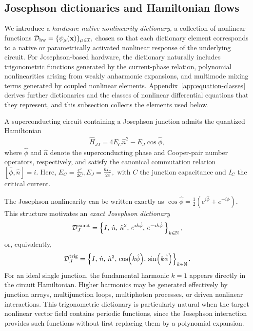 \documentclass[pra,twocolumn,superscriptaddress,nofootinbib,floatfix]{revtex4-2}
\theoremstyle{remark}
\begin{document}
\subsection{Josephson dictionaries and Hamiltonian flows}
\label{subsec:dictionaries}

We introduce a \emph{hardware-native nonlinearity dictionary}, a collection of nonlinear functions
$\mathcal D_{\rm hw} = \{\psi_\mu(\mathbf x) \}_{\mu\in\mathcal I},$
chosen so that each dictionary element corresponds to a native or parametrically activated nonlinear response of the underlying circuit. For Josephson-based hardware, the dictionary naturally includes trigonometric functions generated by the current-phase relation, polynomial nonlinearities arising from weakly anharmonic expansions, and multimode mixing terms generated by coupled nonlinear elements. Appendix~\ref{app:equation-classes} derives further dictionaries and the classes of nonlinear differential equations that they represent, and this subsection collects the elements used below.

A superconducting circuit containing a Josephson junction admits the quantized Hamiltonian
\begin{align}
\hat H_{JJ}=4E_C \hat n^2-E_J\cos\hat\phi,
\label{eq:jj-hamiltonian}
\end{align}
where \(\hat \phi\) and \(\hat n\) denote the superconducting phase and Cooper-pair number operators, respectively, and satisfy the canonical commutation relation
\([\hat\phi,\hat n]=i.\)
Here,
$E_C=\frac{e^2}{2C}, E_J=\frac{\hbar I_C}{2e},$
with \(C\) the junction capacitance and \(I_C\) the critical current.

The Josephson nonlinearity can be written exactly as
\(\cos\hat\phi=\frac{1}{2}\left(e^{i\hat\phi}+e^{-i\hat\phi}\right).\)
This structure motivates an \emph{exact Josephson dictionary}
\begin{align}
\mathcal D_{J}^{\rm exact}=\left\{I,\,\hat n,\,\hat n^2,\,e^{ik\hat\phi},\,e^{-ik\hat\phi}\,\right\}_{k\in\mathbb N},
\label{eq:exact-josephson-dictionary}
\end{align}
or, equivalently,
\begin{align}
\mathcal D_{J}^{\rm trig}=\left\{I,\,\hat n,\,\hat n^2,\,\cos(k\hat\phi),\,\sin(k\hat\phi)\right\}_{k\in\mathbb N}.
\label{eq:trig-josephson-dictionary}
\end{align}
For an ideal single junction, the fundamental harmonic \(k=1\) appears directly in the circuit Hamiltonian. Higher harmonics may be generated effectively by junction arrays, multijunction loops, multiphoton processes, or driven nonlinear interactions. This trigonometric dictionary is particularly natural when the target nonlinear vector field contains periodic functions, since the Josephson interaction provides such functions without first replacing them by a polynomial expansion.
\end{document}
